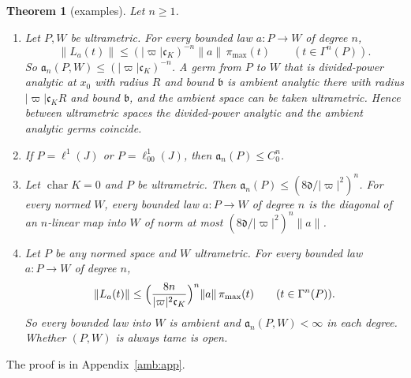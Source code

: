 \documentclass[11pt]{amsart}
\newtheorem{theorem}{Theorem}[section]
\theoremstyle{definition}
\theoremstyle{remark}
\numberwithin{equation}{section}
\newcommand{\abs}[1]{\lvert #1\rvert}
\newcommand{\norm}[1]{\lVert #1\rVert}
\theoremstyle{plain}
\theoremstyle{definition}
\theoremstyle{plain}
\begin{document}
\begin{theorem}[examples]\label{amb:thm:tame-examples}
Let $n\ge1$.
\begin{enumerate}
\item Let $P,W$ be ultrametric. For every bounded law $a\colon P\to W$ of degree $n$,
\begin{equation}\label{amb:eq:pimax}
 \norm{L_a(t)}\le(\abs\varpi\mathfrak c_K)^{-n}\norm a\,\pi_{\max}(t)\qquad(t\in\Gamma^n(P)).
\end{equation}
So $\mathfrak a_n(P,W)\le(\abs\varpi\mathfrak c_K)^{-n}$. A germ from $P$ to $W$ that is divided-power analytic at $x_0$ with radius $R$ and bound $\mathfrak b$ is ambient analytic there with radius $\abs\varpi\mathfrak c_KR$ and bound $\mathfrak b$, and the ambient space can be taken ultrametric. Hence between ultrametric spaces the divided-power analytic and the ambient analytic germs coincide.
\item If $P=\ell^1(J)$ or $P=\ell^1_{00}(J)$, then $\mathfrak a_n(P)\le C_0^n$.
\item Let $\operatorname{char}K=0$ and $P$ be ultrametric. Then $\mathfrak a_n(P)\le(8\mathfrak d/\abs\varpi^2)^n$. For every normed $W$, every bounded law $a\colon P\to W$ of degree $n$ is the diagonal of an $n$-linear map into $W$ of norm at most $(8\mathfrak d/\abs\varpi^2)^n\norm a$.
\item Let $P$ be any normed space and $W$ ultrametric. For every bounded law $a\colon P\to W$ of degree $n$,
\begin{equation}\label{amb:eq:hull}
 \norm{L_a(t)}\le\Bigl(\frac{8n}{\abs\varpi^2\mathfrak c_K}\Bigr)^n\norm a\,\pi_{\max}(t)\qquad(t\in\Gamma^n(P)).
\end{equation}
So every bounded law into $W$ is ambient and $\mathfrak a_n(P,W)<\infty$ in each degree. Whether $(P,W)$ is always tame is open.
\end{enumerate}
\end{theorem}
The proof is in Appendix~\ref{amb:app}.
\end{document}
